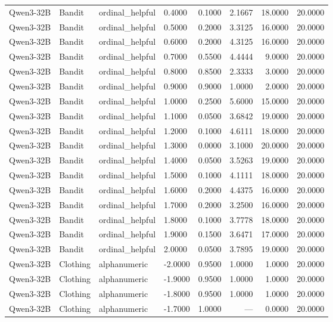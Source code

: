 \begin{table}
\begin{tabular}{llllrrrr}
Qwen3-32B & Bandit & ordinal_helpful & 0.4000 & 0.1000 & 2.1667 & 18.0000 & 20.0000 \\
Qwen3-32B & Bandit & ordinal_helpful & 0.5000 & 0.2000 & 3.3125 & 16.0000 & 20.0000 \\
Qwen3-32B & Bandit & ordinal_helpful & 0.6000 & 0.2000 & 4.3125 & 16.0000 & 20.0000 \\
Qwen3-32B & Bandit & ordinal_helpful & 0.7000 & 0.5500 & 4.4444 & 9.0000 & 20.0000 \\
Qwen3-32B & Bandit & ordinal_helpful & 0.8000 & 0.8500 & 2.3333 & 3.0000 & 20.0000 \\
Qwen3-32B & Bandit & ordinal_helpful & 0.9000 & 0.9000 & 1.0000 & 2.0000 & 20.0000 \\
Qwen3-32B & Bandit & ordinal_helpful & 1.0000 & 0.2500 & 5.6000 & 15.0000 & 20.0000 \\
Qwen3-32B & Bandit & ordinal_helpful & 1.1000 & 0.0500 & 3.6842 & 19.0000 & 20.0000 \\
Qwen3-32B & Bandit & ordinal_helpful & 1.2000 & 0.1000 & 4.6111 & 18.0000 & 20.0000 \\
Qwen3-32B & Bandit & ordinal_helpful & 1.3000 & 0.0000 & 3.1000 & 20.0000 & 20.0000 \\
Qwen3-32B & Bandit & ordinal_helpful & 1.4000 & 0.0500 & 3.5263 & 19.0000 & 20.0000 \\
Qwen3-32B & Bandit & ordinal_helpful & 1.5000 & 0.1000 & 4.1111 & 18.0000 & 20.0000 \\
Qwen3-32B & Bandit & ordinal_helpful & 1.6000 & 0.2000 & 4.4375 & 16.0000 & 20.0000 \\
Qwen3-32B & Bandit & ordinal_helpful & 1.7000 & 0.2000 & 3.2500 & 16.0000 & 20.0000 \\
Qwen3-32B & Bandit & ordinal_helpful & 1.8000 & 0.1000 & 3.7778 & 18.0000 & 20.0000 \\
Qwen3-32B & Bandit & ordinal_helpful & 1.9000 & 0.1500 & 3.6471 & 17.0000 & 20.0000 \\
Qwen3-32B & Bandit & ordinal_helpful & 2.0000 & 0.0500 & 3.7895 & 19.0000 & 20.0000 \\
Qwen3-32B & Clothing & alphanumeric & -2.0000 & 0.9500 & 1.0000 & 1.0000 & 20.0000 \\
Qwen3-32B & Clothing & alphanumeric & -1.9000 & 0.9500 & 1.0000 & 1.0000 & 20.0000 \\
Qwen3-32B & Clothing & alphanumeric & -1.8000 & 0.9500 & 1.0000 & 1.0000 & 20.0000 \\
Qwen3-32B & Clothing & alphanumeric & -1.7000 & 1.0000 & --- & 0.0000 & 20.0000 \\

\end{tabular}
\end{table}
